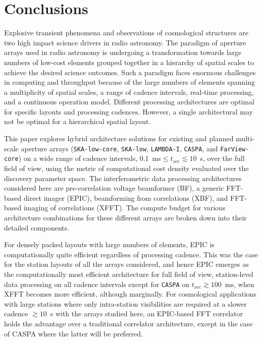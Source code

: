 \documentclass[
  journal=pasa,
  manuscript=article-type,
  year=2020,
  volume=37,
]{cup-journal}
\begin{document}
\section{Conclusions} \label{sec:conclusion}

Explosive transient phenomena and observations of cosmological structures are two high impact science drivers in radio astronomy. The paradigm of aperture arrays used in radio astronomy is undergoing a transformation towards large numbers of low-cost elements grouped together in a hierarchy of spatial scales to achieve the desired science outcomes. Such a paradigm faces enormous challenges in computing and throughput because of the large numbers of elements spanning a multiplicity of spatial scales, a range of cadence intervals, real-time processing, and a continuous operation model. Different processing architectures are optimal for specific layouts and processing cadences. However, a single architectural may not be optimal for a hierarchical spatial layout.

This paper explores hybrid architecture solutions for existing and planned multi-scale aperture arrays (\texttt{SKA-low-core}, \texttt{SKA-low}, \texttt{LAMBDA-I}, \texttt{CASPA}, and \texttt{FarView-core}) on a wide range of cadence intervals, 0.1~ms$\le t_\textrm{acc} \lesssim 10$~s, over the full field of view, using the metric of computational cost density evaluated over the discovery parameter space. The interferometric data processing architectures considered here are pre-correlation voltage beamformer (BF), a generic FFT-based direct imager (EPIC), beamforming from correlations (XBF), and FFT-based imaging of correlations (XFFT). The compute budget for various architecture combinations for these different arrays are broken down into their detailed components. 

For densely packed layouts with large numbers of elements, EPIC is computationally quite efficient regardless of processing cadence. This was the case for the station layouts of all the arrays considered, and hence EPIC emerges as the computationally most efficient architecture for full field of view, station-level data processing on all cadence intervals except for \texttt{CASPA} on $t_\textrm{acc}\gtrsim 100$~ms, when XFFT becomes more efficient, although marginally. For cosmological applications with large stations where only intra-station visibilities are required at a slower cadence $\gtrsim 10$~s with the arrays studied here, an EPIC-based FFT correlator holds the advantage over a traditional correlator architecture, except in the case of CASPA where the latter will be preferred.
\end{document}
